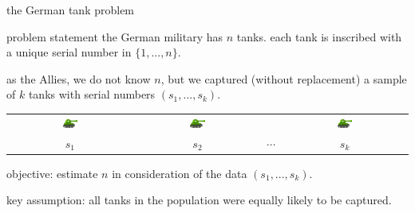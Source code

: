 \documentclass[10pt]{beamer}
\newcommand{\data}{$(s_1, ..., s_k)$\xspace}
\begin{document}
\begin{frame}[t]{the German tank problem}
\begin{alertblock}{problem statement}
the German military has $n$ tanks. 
each tank is inscribed with a unique serial number in $\{1, ..., n\}$. \newline

as the Allies, we do not know $n$, but we captured (without replacement) a sample of $k$ tanks with serial numbers \data. 

\begin{center}
	\begin{tabular}{cccc}
		\includegraphics[width=0.125\textwidth]{../paper/tank.png} &  \includegraphics[width=0.125\textwidth]{../paper/tank.png}  & & \includegraphics[width=0.125\textwidth]{../paper/tank.png} \\
		\large $s_1$ & \large $s_2$ & \large $\cdots$ & \large $s_k$ 
	\end{tabular}
\end{center}


\alert{objective}: estimate $n$ in consideration of the data \data.

\end{alertblock}
\pause 

\alert{key assumption}: all tanks in the population were equally likely to be captured.
\end{frame}
\end{document}
